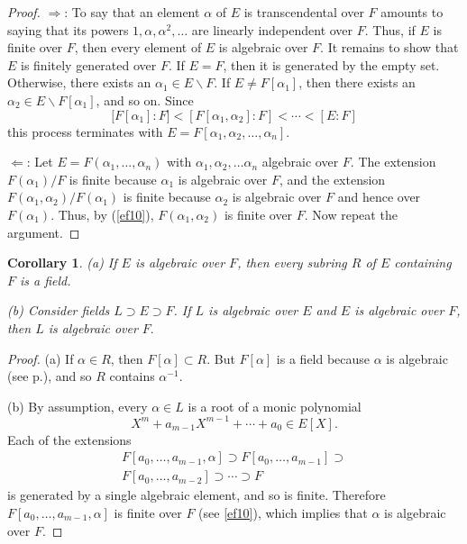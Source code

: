 \documentclass[a4paper,11pt,final,openany]{memoir}
\newtheorem{corollary}[X]{Corollary}
\theoremstyle{nonumberplain}
\newtheorem{proof}{Proof.}
\begin{document}
\begin{proof}
$\Longrightarrow$: To say that an element $\alpha$ of $E$ is transcendental
over $F$ amounts to saying that its powers $1,\alpha,\alpha^{2},\ldots$ are
linearly independent over $F$. Thus, if $E$ is finite over $F$, then every
element of $E$ is algebraic over $F$. It remains to show that $E$ is finitely
generated over $F$. If $E=F$, then it is generated by the empty set.
Otherwise, there exists an $\alpha_{1}\in E\smallsetminus F$. If $E\neq
F[\alpha_{1}]$, then there exists an $\alpha_{2}\in E\smallsetminus
F[\alpha_{1}]$, and so on. Since
\[
\lbrack F[\alpha_{1}]\colon F]<[F[\alpha_{1},\alpha_{2}]\colon F]<\cdots
<[E\colon F]
\]
this process terminates with $E=F[\alpha_{1},\alpha_{2},\ldots,\alpha_{n}]$.

$\Longleftarrow$: Let $E=F(\alpha_{1},...,\alpha_{n})$ with $\alpha_{1}%
,\alpha_{2},\ldots\alpha_{n}$ algebraic over $F$. The extension $F(\alpha
_{1})/F$ is finite because $\alpha_{1}$ is algebraic over $F$, and the
extension $F(\alpha_{1},\alpha_{2})/F(\alpha_{1})$ is finite because
$\alpha_{2}$ is algebraic over $F$ and hence over $F(\alpha_{1})$. Thus, by
(\ref{ef10}), $F(\alpha_{1},\alpha_{2})$ is finite over $F$. Now repeat the argument.
\end{proof}

\begin{corollary}
\label{ef20}(a) If $E$ is algebraic over $F$, then every subring $R$ of $E$
containing $F$ is a field.

(b) Consider fields $L\supset E\supset F$. If $L$ is algebraic over $E$ and
$E$ is algebraic over $F$, then $L$ is algebraic over $F.$
\end{corollary}

\begin{proof}
(a) If $\alpha\in R$, then $F[\alpha]\subset R$. But $F[\alpha]$ is a field
because $\alpha$ is algebraic (see p.\thinspace\pageref{field}), and so $R$
contains $\alpha^{-1}$.

(b) By assumption, every $\alpha\in L$ is a root of a monic polynomial
\[
X^{m}+a_{m-1}X^{m-1}+\cdots+a_{0}\in E[X].
\]
Each of the extensions
\begin{align*}
F[a_{0},\ldots,a_{m-1},\alpha]\supset F[a_{0},\ldots,a_{m-1}]\supset\\
F[a_{0},\ldots,a_{m-2}]\supset\cdots\supset F
\end{align*}
is generated by a single algebraic element, and so is finite. Therefore
$F[a_{0},\ldots,a_{m-1},\alpha]$ is finite over $F$ (see \ref{ef10}), which
implies that $\alpha$ is algebraic over $F$.
\end{proof}
\end{document}
